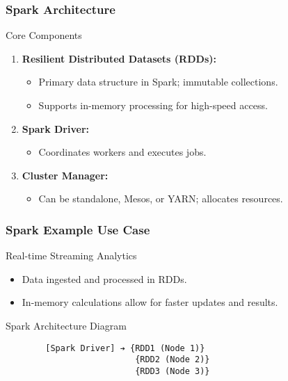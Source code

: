 \documentclass{beamer}
\begin{document}
\begin{frame}[fragile]
    \frametitle{Spark Architecture}
    \begin{block}{Core Components}
        \begin{enumerate}
            \item \textbf{Resilient Distributed Datasets (RDDs):}
                \begin{itemize}
                    \item Primary data structure in Spark; immutable collections.
                    \item Supports in-memory processing for high-speed access.
                \end{itemize}
            \item \textbf{Spark Driver:}
                \begin{itemize}
                    \item Coordinates workers and executes jobs.
                \end{itemize}
            \item \textbf{Cluster Manager:}
                \begin{itemize}
                    \item Can be standalone, Mesos, or YARN; allocates resources.
                \end{itemize}
        \end{enumerate}
    \end{block}
\end{frame}

\begin{frame}[fragile]
    \frametitle{Spark Example Use Case}
    \begin{block}{Real-time Streaming Analytics}
        \begin{itemize}
            \item Data ingested and processed in RDDs.
            \item In-memory calculations allow for faster updates and results.
        \end{itemize}
    \end{block}
    
    \begin{block}{Spark Architecture Diagram}
        \begin{verbatim}
        [Spark Driver] ➔ {RDD1 (Node 1)}
                          {RDD2 (Node 2)}
                          {RDD3 (Node 3)}
        \end{verbatim}
    \end{block}
\end{frame}
\end{document}

